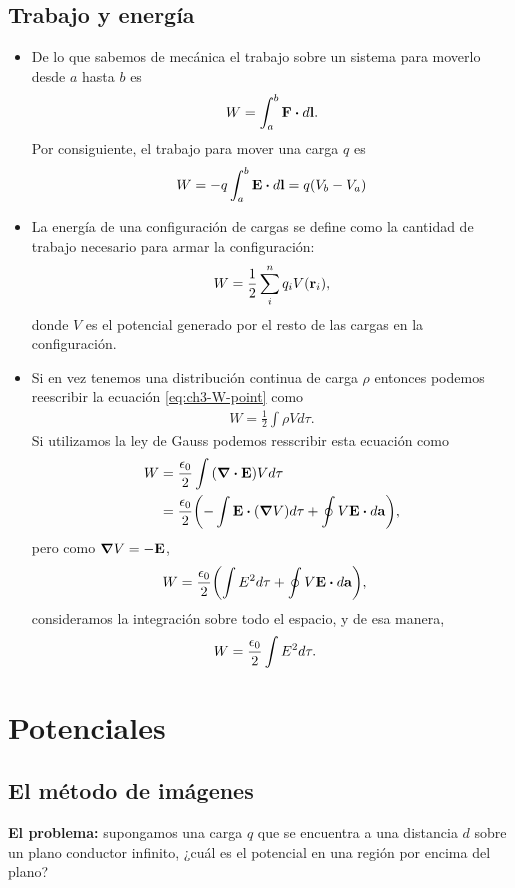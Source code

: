 \subsection{Trabajo y energía}
\begin{itemize}
\item De lo que sabemos de mecánica el trabajo sobre un sistema 
para moverlo desde $a$ hasta $b$ es 
\begin{align}
W=\int_a^b\vb{F}\vdot d\vb{l}.
\end{align}
Por consiguiente, el trabajo para mover una carga $q$ es
\begin{align}
W=-q\int_a^b\vb{E}\vdot d\vb{l}=q\qty(V_b-V_a)
\end{align}

\item La energía de una configuración de cargas se define 
como la cantidad de trabajo necesario para armar la configuración:
\begin{align}
W=\frac{1}{2}\sum_i^nq_iV(\vb{r}_i),
\label{eq:ch3-W-point}
\end{align}
donde $V$ es el potencial generado por el resto de las cargas 
en la configuración.

\item Si en vez tenemos una distribución continua de carga $\rho$
entonces podemos reescribir la ecuación \eqref{eq:ch3-W-point}
como
\begin{align}
W=\frac{1}{2} \int \rho Vd\tau.
\end{align}
Si utilizamos la ley de Gauss podemos resscribir esta ecuación como
\begin{align}
W&=\frac{\ep}{2} \int \qty(\div{\vb{E}}) Vd\tau\nonumber\\
&=\frac{\ep}{2}\qty(-\int \vb{E}\vdot \qty(\grad V)d\tau
+\oint V\vb{E}\vdot d\vb{a}),
\end{align}
pero como $\grad V=-\vb{E}$,
\begin{align}
W&=\frac{\ep}{2}\qty(\int E^2d\tau+\oint V\vb{E}\vdot d\vb{a}),
\end{align}
consideramos la integración sobre todo el espacio, y de esa manera,
\begin{align}
W&=\frac{\epsilon_0}{2}\int E^2d\tau.
\end{align}
\end{itemize}

\section{Potenciales}
\subsection{El método de imágenes}
\textbf{El problema:} supongamos una carga $q$ que se encuentra a 
una distancia $d$ sobre un plano conductor infinito, ¿cuál es el potencial
en una región por encima del plano?

